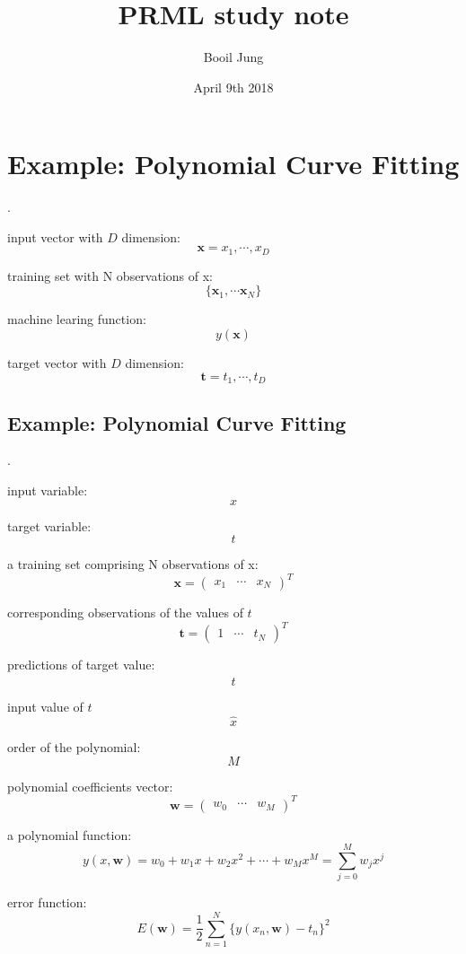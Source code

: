 \documentclass[11pt, a4paper, oneside]{article}
\begin{document}
\title{PRML study note}
\author{Booil Jung}
\date{April 9th 2018}
\maketitle

\section{Example: Polynomial Curve Fitting}
.

input vector with $D$ dimension:
$$
\mathbf{x} = { x_1, \cdots , x_D }
$$

training set with N observations of x: 
$$
\{ \mathbf{x}_1, \cdots \mathbf{x}_N \}
$$

machine learing function:
$$
y(\mathbf{x})
$$

target vector with $D$ dimension:
$$
\mathbf{t} = { t_1, \cdots , t_D }
$$

\subsection{Example: Polynomial Curve Fitting}
.

input variable:
$$
x
$$

target variable:
$$
t
$$

a training set comprising N observations of x:
$$
\mathbf{x}
= \begin{pmatrix}
x_1 & \cdots & x_N
\end{pmatrix} ^T 
$$

corresponding observations of the values of $t$
$$
\mathbf{t}
= \begin{pmatrix}
1 & \cdots & t_N
\end{pmatrix} ^T 
$$

predictions of target value:
$$
\hat{t}
$$

input value of $\hat{t}$
$$
\hat{x}
$$

order of the polynomial:
$$
M
$$

polynomial coefficients vector:
$$
\mathbf{w}
= \begin{pmatrix}
w_0 & \cdots & w_M
\end{pmatrix}^T
$$

a polynomial function:
\begin{equation}
y(x, \mathbf{w})
= w_0 + w_1x + w_2x^2 + \cdots + w_Mx^M
= \sum_{j=0}^M w_j x^j 
\tag{1.1}
\end{equation}

error function:
\begin{equation}
E(\mathbf{w})
= \frac{1}{2} \sum_{n=1}^N \{ y(x_n, \mathbf{w}) - t_n\} ^2
\tag{1.2}
\end{equation}
\end{document}
